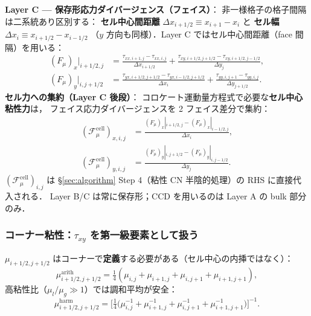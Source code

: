 \noindent\textbf{Layer C — 保存形応力ダイバージェンス（フェイス）}：
非一様格子の格子間隔は二系統あり区別する：
\textbf{セル中心間距離} $\Delta x_{i+1/2}\equiv x_{i+1}-x_i$ と
\textbf{セル幅} $\Delta x_i\equiv x_{i+1/2}-x_{i-1/2}$
（$y$ 方向も同様）．Layer C ではセル中心間距離（face 間隔）を用いる：
\begin{align}
  (F_\mu)_x\big|_{i+1/2,j}
  &= \frac{\tau_{xx,i+1,j}-\tau_{xx,i,j}}{\Delta x_{i+1/2}}
  + \frac{\tau_{xy,i+1/2,j+1/2}-\tau_{xy,i+1/2,j-1/2}}{\Delta y_j}, \label{eq:viscous_layerC_x}\\
  (F_\mu)_y\big|_{i,j+1/2}
  &= \frac{\tau_{yx,i+1/2,j+1/2}-\tau_{yx,i-1/2,j+1/2}}{\Delta x_i}
  + \frac{\tau_{yy,i,j+1}-\tau_{yy,i,j}}{\Delta y_{j+1/2}}. \label{eq:viscous_layerC_y}
\end{align}
\textbf{セル力への集約（Layer C 後段）}：
コロケート運動量方程式で必要な\textbf{セル中心粘性力}は，
フェイス応力ダイバージェンスを 2 フェイス差分で集約：
\begin{align}
  (\mathcal{F}_\mu^\text{cell})_{x,i,j}
  &= \frac{(F_\mu)_x|_{i+1/2,j} - (F_\mu)_x|_{i-1/2,j}}{\Delta x_i}, \label{eq:viscous_facetocell_x}\\
  (\mathcal{F}_\mu^\text{cell})_{y,i,j}
  &= \frac{(F_\mu)_y|_{i,j+1/2} - (F_\mu)_y|_{i,j-1/2}}{\Delta y_j}. \label{eq:viscous_facetocell_y}
\end{align}
$(\mathcal{F}_\mu^\text{cell})_{i,j}$ は §\ref{sec:algorithm} Step 4（粘性 CN 半陰的処理）の
RHS に直接代入される．
Layer B/C は常に保存形；CCD を用いるのは Layer A の bulk 部分のみ．

\subsubsection{コーナー粘性：$\tau_{xy}$ を第一級要素として扱う}
\label{sec:viscous_corner}

$\mu_{i+1/2,j+1/2}$ はコーナーで\textbf{定義}する必要がある（セル中心の内挿ではなく）：
\begin{equation}
  \mu_{i+1/2,j+1/2}^\text{arith}
  = \tfrac{1}{4}(\mu_{i,j} + \mu_{i+1,j} + \mu_{i,j+1} + \mu_{i+1,j+1}),
  \label{eq:viscous_mu_corner_arith}
\end{equation}
高粘性比（$\mu_l/\mu_g\gg 1$）では調和平均が安全：
\begin{equation}
  \mu_{i+1/2,j+1/2}^\text{harm}
  = \biggl[\tfrac{1}{4}\bigl(\mu_{i,j}^{-1} + \mu_{i+1,j}^{-1} + \mu_{i,j+1}^{-1} + \mu_{i+1,j+1}^{-1}\bigr)\biggr]^{-1}.
  \label{eq:viscous_mu_corner_harm}
\end{equation}

